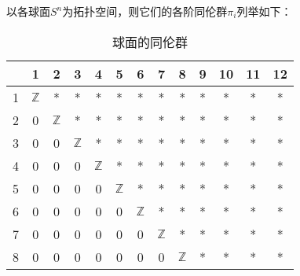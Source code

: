 

以各球面$S^n$为拓扑空间，则它们的各阶同伦群$\pi_i$列举如下：

\begin{table}[ht]
\centering
\caption{球面的同伦群}\label{SphHmt_tab1}
\begin{tabular}{|c|c|c|c|c|c|c|c|c|c|c|c|c|}
\hline
 & 1 & 2 & 3 & 4 & 5 & 6 & 7 & 8 & 9 & 10 & 11 & 12 \\
\hline
1 & $\mathbb{Z}$ & * & * & * & * & * & * & * & * & * & * & * \\
\hline
2 & 0 & $\mathbb{Z}$ & * & * & * & * & * & * & * & * & * & * \\
\hline
3 & 0 & 0 & $\mathbb{Z}$ & * & * & * & * & * & * & * & * & * \\
\hline
4 & 0 & 0 & 0 & $\mathbb{Z}$ & * & * & * & * & * & * & * & * \\
\hline
5 & 0 & 0 & 0 & 0 & $\mathbb{Z}$ & * & * & * & * & * & * & * \\
\hline
6 & 0 & 0 & 0 & 0 & 0 & $\mathbb{Z}$ & * & * & * & * & * & * \\
\hline
7 & 0 & 0 & 0 & 0 & 0 & 0 & $\mathbb{Z}$ & * & * & * & * & * \\
\hline
8 & 0 & 0 & 0 & 0 & 0 & 0 & 0 & $\mathbb{Z}$ & * & * & * & * \\
\hline
\end{tabular}
\end{table}